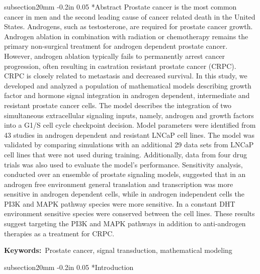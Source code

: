 \documentclass[12pt]{article}
\makeatletter
\renewcommand\section{\@startsection
	{subsection}{2}{0mm}
	{-0.2in}
	{0.05\baselineskip}
	{\normalfont\large\bfseries}}
\makeatother
\begin{document}
\section*{Abstract}
Prostate cancer is the most common cancer in men and the second leading cause of cancer related death in the United States. 
Androgens, such as testosterone, are required for prostate cancer growth. 
Androgen ablation in combination with radiation or chemotherapy remains the primary non-surgical treatment for androgen dependent prostate cancer. 
However, androgen ablation typically fails to permanently arrest cancer progression, often resulting in castration resistant prostate cancer (CRPC). 
CRPC is closely related to metastasis and decreased survival. 
In this study, we developed and analyzed a population of mathematical models describing growth factor and hormone signal integration in androgen dependent, intermediate and resistant prostate cancer cells. 
The model describes the integration of two simultaneous extracellular signaling inputs, namely, androgen and growth factors into a G1/S cell cycle checkpoint decision. 
Model parameters were identified from 43 studies in androgen dependent and resistant LNCaP cell lines. 
The model was validated by comparing simulations with an additional 29 data sets from LNCaP cell lines that were not used during training. 
Additionally, data from four drug trials was also used to evaluate the model’s performance.
Sensitivity analysis, conducted over an ensemble of prostate signaling models, suggested that in an androgen free environment general translation and transcription was more sensitive in androgen dependent cells, while in androgen independent cells the PI3K and MAPK pathway species were more sensitive. 
In a constant DHT environment sensitive species were conserved between the cell lines. 
These results suggest targeting the PI3K and MAPK pathways in addition to anti-androgen therapies as a treatment for CRPC.

\vspace{0.5in}
{\noindent \textbf{Keywords:}~Prostate cancer, signal transduction, mathematical modeling}

\pagebreak

\setcounter{page}{1}

\linenumbers

\section*{Introduction}
\end{document}

